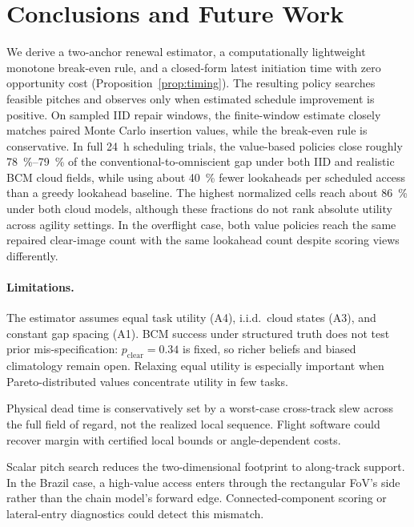 \section{Conclusions and Future Work}
\label{sec:conclusion}

We derive a two-anchor renewal estimator, a computationally lightweight monotone break-even rule, and a closed-form latest initiation time with zero opportunity cost (Proposition~\ref{prop:timing}). The resulting policy searches feasible pitches and observes only when estimated schedule improvement is positive. On sampled IID repair windows, the finite-window estimate closely matches paired Monte Carlo insertion values, while the break-even rule is conservative.
In full \SI{24}{\hour} scheduling trials, the value-based policies close roughly \SI{78}{\percent}--\SI{79}{\percent} of the conventional-to-omniscient gap under both IID and realistic BCM cloud fields, while using about \SI{40}{\percent} fewer lookaheads per scheduled access than a greedy lookahead baseline.
The highest normalized cells reach about \SI{86}{\percent} under both cloud models, although these fractions do not rank absolute utility across agility settings. In the overflight case, both value policies reach the same repaired clear-image count with the same lookahead count despite scoring views differently.

\paragraph{Limitations.}
The estimator assumes equal task utility (A4), i.i.d.\ cloud states (A3), and constant gap spacing (A1). BCM success under structured truth does not test prior mis-specification: $p_{\mathrm{clear}}=0.34$ is fixed, so richer beliefs and biased climatology remain open. Relaxing equal utility is especially important when Pareto-distributed values concentrate utility in few tasks.

Physical dead time is conservatively set by a worst-case cross-track slew across the full field of regard, not the realized local sequence. Flight software could recover margin with certified local bounds or angle-dependent costs.

Scalar pitch search reduces the two-dimensional footprint to along-track support. In the Brazil case, a high-value access enters through the rectangular FoV's side rather than the chain model's forward edge. Connected-component scoring or lateral-entry diagnostics could detect this mismatch.

